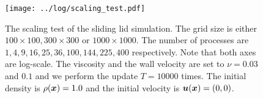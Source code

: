 \begin{figure}[b]
  \centering
  \texttt{[image: ../log/scaling\_test.pdf]}
  \vspace{-3mm}
  \caption{The scaling test of the sliding lid simulation.
  The grid size is either $100 \times 100, 300 \times 300 \text{ or } 1000 \times 1000$.
  The number of processes are $1 ,4 ,9 ,16 ,25 ,36 ,100 ,144 ,225 ,400$ respectively.
  Note that both axes are log-scale.
    The viscosity and the wall velocity are set to $\nu = 0.03$ and $0.1$
    and we perform the update $T = 10000$ times.
    The initial density is $\rho(\boldsymbol{x}) = 1.0$ and the initial velocity is $\boldsymbol{u}(\boldsymbol{x}) = (0, 0)$.
  }
  \label{fig:sliding-lid-scaling}
\end{figure}
